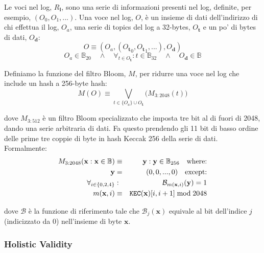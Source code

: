 \documentclass[9pt,oneside]{amsart}
\begin{document}
\begin{multicols}{2}

Le voci nel log, $R_\mathbf{l}$, sono una serie di informazioni presenti nel log, definite, per esempio, $(O_0, O_1, ...)$. Una voce nel log, $O$, è un insieme di dati dell'indirizzo di chi effettua il log, $O_a$, una serie di topics del log a 32-bytes, $O_\mathbf{t}$ e un po' di bytes di dati, $O_\mathbf{d}$:
\begin{equation}
O \equiv (O_a, ({O_\mathbf{t}}_0, {O_\mathbf{t}}_1, ...), O_\mathbf{d})
\end{equation}
\begin{equation}
O_a \in \mathbb{B}_{20} \quad \wedge \quad \forall_{t \in O_\mathbf{t}}: t \in \mathbb{B}_{32} \quad \wedge \quad O_\mathbf{d} \in \mathbb{B}
\end{equation}

Definiamo la funzione del filtro Bloom, $M$, per ridurre una voce nel log che include un hash a 256-byte hash:
\begin{equation}
M(O) \equiv \bigvee_{t \in \{O_a\} \cup O_\mathbf{t}} \big( M_{3:2048}(t) \big)
\end{equation}

dove $M_{3:512}$ è un filtro Bloom specializzato che imposta tre bit al di fuori di 2048, dando una serie arbitraria di dati. Fa questo prendendo gli 11 bit di basso ordine delle prime tre coppie di byte in hash Keccak 256 della serie di dati. Formalmente:
\begin{eqnarray}
M_{3:2048}(\mathbf{x}: \mathbf{x} \in \mathbb{B}) & \equiv & \mathbf{y}: \mathbf{y} \in \mathbb{B}_{256} \quad \text{where:}\\
\mathbf{y} & = & (0, 0, ..., 0) \quad \text{except:}\\
\forall_{i \in \{0, 2, 4\}}&:& \mathcal{B}_{m(\mathbf{x}, i)}(\mathbf{y}) = 1\\
m(\mathbf{x}, i) &\equiv& \mathtt{\tiny KEC}(\mathbf{x})[i, i + 1] \bmod 2048
\end{eqnarray}

dove $\mathcal{B}$ è la funzione di riferimento tale che $\mathcal{B}_j(\mathbf{x})$ equivale al bit dell'indice $j$ (indicizzato da 0) nell'insieme di byte $\mathbf{x}$.

\subsubsection{Holistic Validity}


\end{multicols}
\end{document}

